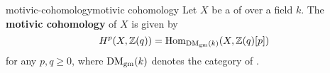 \begin{topic}{motivic-cohomology}{motivic cohomology}
    Let $X$ be a   of  over a field $k$. The \textbf{motivic cohomology} of $X$ is given by
    \[ H^p(X, \mathbb{Z}(q)) = \operatorname{Hom}_{\textup{DM}_\textup{gm}(k)}(X, \mathbb{Z}(q)[p]) \]
    for any $p, q \ge 0$, where $\textup{DM}_\textup{gm}(k)$ denotes the category of .
\end{topic}
